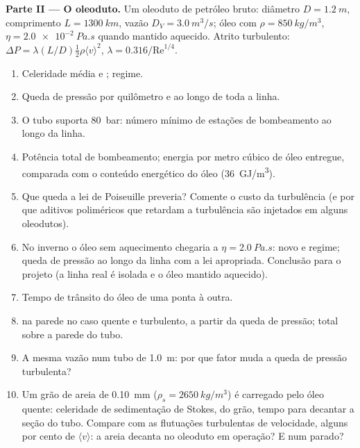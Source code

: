 \begin{problem}
\medskip
\noindent\textbf{Parte II --- O oleoduto.}
Um oleoduto de petróleo bruto: diâmetro $D = \qty{1.2}{m}$, comprimento $L = \qty{1300}{km}$,
vazão $D_V = \qty{3.0}{m^3/s}$; óleo com $\rho = \qty{850}{kg/m^3}$, $\eta =
\qty{2.0e-2}{Pa.s}$ quando mantido aquecido. Atrito turbulento: $\Delta P = \lambda
(L/D)\tfrac12\rho\langle v\rangle^2$, $\lambda = 0.316/\mathrm{Re}^{1/4}$.
\begin{enumerate}[resume]
  \item Celeridade média e ; regime.
  \item Queda de pressão por quilômetro e ao longo de toda a linha.
  \item O tubo suporta \qty{80}{bar}: número mínimo de estações de bombeamento
        ao longo da linha.
  \item Potência total de bombeamento; energia por metro cúbico de óleo entregue,
        comparada com o conteúdo energético do óleo (\qty{36}{GJ/m^3}).
  \item Que queda a lei de Poiseuille preveria? Comente o custo
        da turbulência (e por que aditivos poliméricos que retardam
        a turbulência são injetados em alguns oleodutos).
  \item No inverno o óleo sem aquecimento chegaria a $\eta = \qty{2.0}{Pa.s}$:
        novo  e regime; queda de pressão ao longo da linha
        com a lei apropriada. Conclusão para o projeto (a linha real
        é isolada e o óleo mantido aquecido).
  \item Tempo de trânsito do óleo de uma ponta à outra.
  \item {} na parede no caso quente e turbulento, a partir da
        queda de pressão;  total sobre a parede do tubo.
  \item A mesma vazão num tubo de \qty{1.0}{m}: por que fator muda a
        queda de pressão turbulenta?
  \item Um grão de areia de \qty{0.10}{mm} ($\rho_s = \qty{2650}{kg/m^3}$) é carregado
        pelo óleo quente: celeridade de sedimentação de Stokes,  do
        grão, tempo para decantar a seção do tubo. Compare com as
        flutuações turbulentas de velocidade, alguns por cento de $\langle v
        \rangle$: a areia decanta no oleoduto em operação? E num
        parado?
\end{enumerate}


\end{problem}
